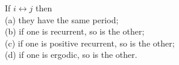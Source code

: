\documentclass[a4paper]{article}
\begin{document}
\begin{thm}
If $i \leftrightarrow j$ then\\
(a) they have the same period;\\
(b) if one is recurrent, so is the other;\\
(c) if one is positive recurrent, so is the other;\\
(d) if one is ergodic, so is the other.
\end{thm}
\end{document}
